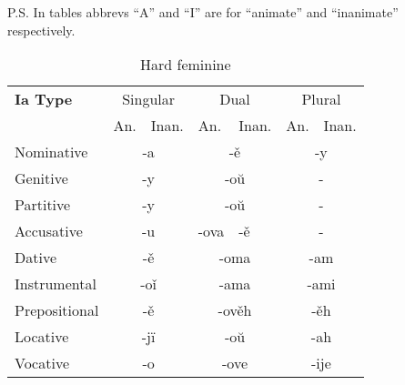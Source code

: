 P.S. In tables abbrevs “A” and “I” are for “animate” and “inanimate” respectively.


\begin{table}
	\caption{Hard feminine}
	\begin{tabular}{lllllll}
		\textbf{Ia Type}       
			& \multicolumn{2}{c}{Singular} 
				& \multicolumn{2}{c}{Dual} 
					& \multicolumn{2}{c}{Plural} \\
		& An.   & Inan.  & An.   & Inan.   & An.  & Inan. \\
		Nominative    & \multicolumn{2}{c}{-a}      
						& \multicolumn{2}{c}{-ě}        
							& \multicolumn{2}{c}{-y} \\
		Genitive      & \multicolumn{2}{c}{-y}       
						& \multicolumn{2}{c}{-oŭ}      
							& \multicolumn{2}{c}{-}   \\
		Partitive     & \multicolumn{2}{c}{-y}       
						& \multicolumn{2}{c}{-oŭ}      
							& \multicolumn{2}{c}{-} \\
		Accusative    & \multicolumn{2}{c}{-u}       
						& -ova & -ě
							& \multicolumn{2}{c}{-} \\
		Dative        & \multicolumn{2}{c}{-ě}       
						& \multicolumn{2}{c}{-oma}     
							& \multicolumn{2}{c}{-am} \\
		Instrumental  & \multicolumn{2}{c}{-oǐ}     
						 & \multicolumn{2}{c}{-ama}     
						 	& \multicolumn{2}{c}{-ami} \\
		Prepositional & \multicolumn{2}{c}{-ě}       
						& \multicolumn{2}{c}{-ověh}     
							& \multicolumn{2}{c}{-ěh} \\
		Locative      & \multicolumn{2}{c}{-jï}      
						& \multicolumn{2}{c}{-oŭ}       
							& \multicolumn{2}{c}{-ah} \\ 
		Vocative      & \multicolumn{2}{c}{-o}       
						& \multicolumn{2}{c}{-ove}      
							& \multicolumn{2}{c}{-ije}
	\end{tabular}
\end{table}



